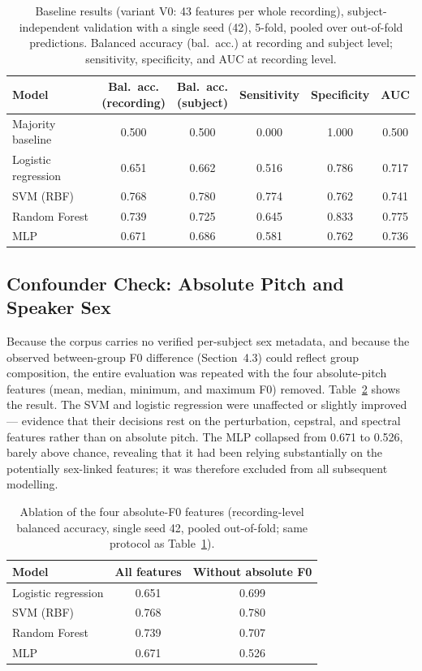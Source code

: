 \begin{table}[htb]
\centering
\caption{Baseline results (variant V0: 43 features per whole
recording), subject-independent validation with a single seed (42),
5-fold, pooled over out-of-fold predictions. Balanced accuracy (bal.\
acc.) at recording and subject level; sensitivity, specificity, and
AUC at recording level.}
\label{tab:phase4}
\small
\begin{tabular}{lccccc}
\toprule
Model & \makecell[c]{Bal.\ acc.\\(recording)} &
\makecell[c]{Bal.\ acc.\\(subject)} & Sensitivity & Specificity & AUC \\
\midrule
Majority baseline   & 0.500 & 0.500 & 0.000 & 1.000 & 0.500 \\
Logistic regression & 0.651 & 0.662 & 0.516 & 0.786 & 0.717 \\
SVM (RBF)           & 0.768 & 0.780 & 0.774 & 0.762 & 0.741 \\
Random Forest       & 0.739 & 0.725 & 0.645 & 0.833 & 0.775 \\
MLP                 & 0.671 & 0.686 & 0.581 & 0.762 & 0.736 \\
\bottomrule
\end{tabular}
\end{table}

\subsection{Confounder Check: Absolute Pitch and Speaker Sex}

Because the corpus carries no verified per-subject sex metadata, and
because the observed between-group F0 difference (Section~4.3) could
reflect group composition, the entire evaluation was repeated with the
four absolute-pitch features (mean, median, minimum, and maximum F0)
removed. Table~\ref{tab:ablation} shows the result. The SVM and
logistic regression were unaffected or slightly improved --- evidence
that their decisions rest on the perturbation, cepstral, and spectral
features rather than on absolute pitch. The MLP collapsed from 0.671
to 0.526, barely above chance, revealing that it had been relying
substantially on the potentially sex-linked features; it was therefore
excluded from all subsequent modelling.

\begin{table}[htb]
\centering
\caption{Ablation of the four absolute-F0 features
(recording-level balanced accuracy, single seed 42, pooled
out-of-fold; same protocol as Table~\ref{tab:phase4}).}
\label{tab:ablation}
\begin{tabular}{lcc}
\toprule
Model & All features & Without absolute F0 \\
\midrule
Logistic regression & 0.651 & 0.699 \\
SVM (RBF)           & 0.768 & 0.780 \\
Random Forest       & 0.739 & 0.707 \\
MLP                 & 0.671 & 0.526 \\
\bottomrule
\end{tabular}
\end{table}

